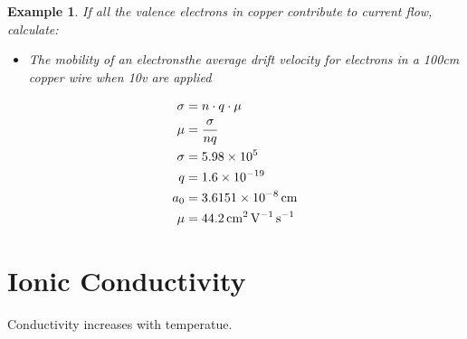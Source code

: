 \documentclass{article}
\newtheorem{theorem}{Example}
\begin{document}
\begin{theorem}
    If all the valence electrons in copper contribute to current flow, calculate:
    \begin{itemize}
        \item The mobility of an electronsthe average drift velocity for electrons in a 100cm copper wire when 10v are applied
    \end{itemize}
    \begin{equation*}
        \begin{aligned}
            \sigma & = n \cdot q \cdot \mu          \\
            \mu    & = \frac{\sigma}{nq}            \\
            \sigma & = \num{5.98E5}                 \\
            q      & = \num{1.6E-19}                \\
            a_0    & = \SI{3.6151E-8}{\centi\meter} \\
            \mu &= \SI{44.2}{\centi\meter\squared\per\volt\per\second}
        \end{aligned}
    \end{equation*}
\end{theorem}
\section*{Ionic Conductivity}
Conductivity increases with temperatue.
\end{document}
